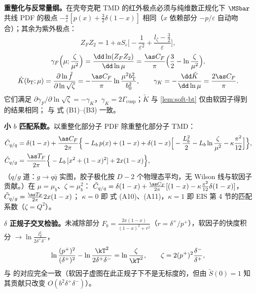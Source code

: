 \begin{example}
\textbf{重整化与反常量纲。}在壳夸克靶 TMD 的红外极点必须与纯维数正规化下 $\MSbar$ 共线 PDF 的极点
$-\frac a\varepsilon[p(x)+\frac32\delta(1-x)]$ 相同（$x$ 依赖部分 $-p/\varepsilon$ 自动吻合）；其余为紫外极点：
\begin{equation}
  Z_FZ_2=1+aS_\varepsilon\Big[-\frac1{\varepsilon^2}+\frac{l_\zeta-\tfrac32}{\varepsilon}\Big],
  \label{eq:ZF-1loop}
\end{equation}
\begin{equation}
  \begin{gathered}
  \gamma_F\Big(\mu;\frac\zeta{\mu^2}\Big)=\frac{\dd\ln(Z_FZ_2)}{\dd\ln\mu}=\frac{\as C_F}{\pi}\Big(\frac32-\ln\frac\zeta{\mu^2}\Big),\\
  \tilde K(b_{\mathrm T};\mu)=\frac{\partial\ln\tilde f}{\partial\ln\sqrt\zeta}=-\frac{\as C_F}{\pi}\ln\frac{\mu^2b_{\mathrm T}^2}{b_0^2},\qquad
  \gamma_K=-\frac{\dd\tilde K}{\dd\ln\mu}=\frac{2\as C_F}{\pi}.
  \end{gathered}
  \label{eq:gammaF-K-1loop}
\end{equation}
它们满足 $\partial\gamma_F/\partial\ln\sqrt\zeta=-\gamma_K$，$\gamma_K=2\Gamma_{\mathrm{cusp}}$；$\tilde K$ 与 \cref{lem:soft-bt} 仅由软因子得到的结果相同；
与 \cite{AybatRogers2011} 式 (B1)--(B3) 一致。

\textbf{小 $b$ 匹配系数。}以重整化部分子 PDF 除重整化部分子 TMD：
\begin{align}
  \tilde C_{q/q}&=\delta(1-x)+\frac{\as C_F}{2\pi}\Big\{-L_b\,p(x)+(1-x)+\delta(1-x)\Big[-\frac{L_b^2}2-L_b\ln\frac\zeta{\mu^2}-\kappa\frac{\pi^2}{12}\Big]\Big\},
  \label{eq:Ctilde-qq}\\
  \tilde C_{q/g}&=\frac{\as T_F}{2\pi}\Big\{-L_b\,[x^2+(1-x)^2]+2x(1-x)\Big\},
  \label{eq:Ctilde-qg}
\end{align}
（$q/g$ 道：$g\to q\bar q$ 实图，胶子极化按 $D-2$ 个物理态平均，无 Wilson 线与软因子贡献。）在 $\mu=\mu_b$、$\zeta=\mu_b^2$：
$\tilde C_{q/q}=\delta(1-x)+\frac{\as C_F}{2\pi}[(1-x)-\kappa\frac{\pi^2}{12}\delta(1-x)]$，$\tilde C_{q/g}=\frac{\as T_F}{2\pi}2x(1-x)$；
$\kappa=0$ 即 \cite{AybatRogers2011} 式 (A10)、(A11)，$\kappa=1$ 即 EIS\cite{EchevarriaIdilbiScimemi2012} 第 4 节的匹配系数（$\zeta=Q^2$）。

\textbf{$\delta$ 正规子交叉检验。}未减除部分 $F_b=\frac{2x(1-x)}{(1-x)^2+r^2}$（$r=\delta^+/p^+$），软因子的快度积分 $\to\ln\frac{l_{\mathrm T}^2}{2\delta^+\delta^-}$，
\begin{equation}
  \ln\frac{(p^+)^2}{(\delta^+)^2}-\ln\frac{\kT^2}{2\delta^+\delta^-}=\ln\frac{\zeta}{\kT^2},\qquad\zeta=2(p^+)^2\frac{\delta^-}{\delta^+},
  \label{eq:delta-reg-check}
\end{equation}
与 \cite{CollinsRogers2013} 的对应完全一致（软因子虚图在此正规子下不是无标度的，但由 $\tilde S(0)=1$ 知其贡献只改变 $O(b^2\delta^+\delta^-)$）。
\end{example}

